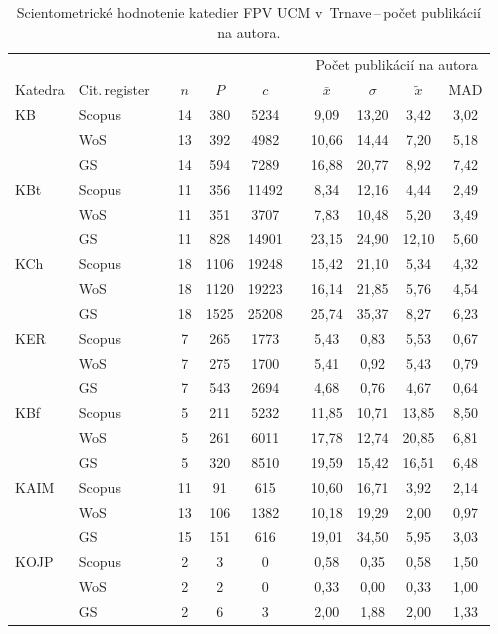 \begin{table}
  \centering\small
  \caption[Hodnotenie FPV\,--\,počet publikácií na autora]%
  {Scientometrické hodnotenie katedier FPV UCM v~Trnave\,--\,počet publikácií na
    autora.}
  \label{tab:1-staff.results}
  \begin{tabularx}{\textwidth}{XXp{0.7ex}c@{\hspace{2.5em}}c@{\hspace{2.5em}}cp{0.7ex}cccc}
    \toprule
    & & & & & & & \multicolumn{4}{c}{Počet publikácií na autora} \\
    \cmidrule{8-11}
    Katedra & Cit.\,register & & $n$ & $P$ & $c$ & & $\bar{x}$ & $\sigma$ & $\tilde{x}$ & MAD \\
    \midrule
    KB   & Scopus & & 14 & 380  & 5234  & & 9,09  & 13,20 & 3,42  & 3,02 \\
         & WoS    & & 13 & 392  & 4982  & & 10,66 & 14,44 & 7,20  & 5,18 \\
         & GS     & & 14 & 594  & 7289  & & 16,88 & 20,77 & 8,92  & 7,42 \\[1ex]
    KBt  & Scopus & & 11 & 356  & 11492 & & 8,34  & 12,16 & 4,44  & 2,49 \\
         & WoS    & & 11 & 351  & 3707  & & 7,83  & 10,48 & 5,20  & 3,49 \\
         & GS     & & 11 & 828  & 14901 & & 23,15 & 24,90 & 12,10 & 5,60 \\[1ex]
    KCh  & Scopus & & 18 & 1106 & 19248 & & 15,42 & 21,10 & 5,34  & 4,32 \\
         & WoS    & & 18 & 1120 & 19223 & & 16,14 & 21,85 & 5,76  & 4,54 \\
         & GS     & & 18 & 1525 & 25208 & & 25,74 & 35,37 & 8,27  & 6,23 \\[1ex]
    KER  & Scopus & & 7  & 265  & 1773  & & 5,43  & 0,83  & 5,53  & 0,67 \\
         & WoS    & & 7  & 275  & 1700  & & 5,41  & 0,92  & 5,43  & 0,79 \\
         & GS     & & 7  & 543  & 2694  & & 4,68  & 0,76  & 4,67  & 0,64 \\[1ex]
    KBf  & Scopus & & 5  & 211  & 5232  & & 11,85 & 10,71 & 13,85 & 8,50 \\
         & WoS    & & 5  & 261  & 6011  & & 17,78 & 12,74 & 20,85 & 6,81 \\
         & GS     & & 5  & 320  & 8510  & & 19,59 & 15,42 & 16,51 & 6,48 \\[1ex]
    KAIM & Scopus & & 11 & 91   & 615   & & 10,60 & 16,71 & 3,92  & 2,14 \\
         & WoS    & & 13 & 106  & 1382  & & 10,18 & 19,29 & 2,00  & 0,97 \\
         & GS     & & 15 & 151  & 616   & & 19,01 & 34,50 & 5,95  & 3,03 \\[1ex]
    KOJP & Scopus & & 2  & 3    & 0     & & 0,58  & 0,35  & 0,58  & 1,50 \\
         & WoS    & & 2  & 2    & 0     & & 0,33  & 0,00  & 0,33  & 1,00 \\
         & GS     & & 2  & 6    & 3     & & 2,00  & 1,88  & 2,00  & 1,33 \\
    \bottomrule
  \end{tabularx}
\end{table}

